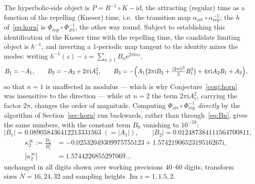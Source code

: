 \documentclass[11pt,a4paper]{article}
\theoremstyle{definition}
\newcommand{\Rr}{R}
\newcommand{\Kk}{K}
\newcommand{\eee}{\mathrm{e}}
\newcommand{\ii}{\mathrm{i}}
\begin{document}
The hyperbolic-side object is $P=\Rr^{-1}\circ\Kk-\mathrm{id}$, the attracting
(regular) time as a function of the repelling (Kneser) time, i.e.\ the
transition map $\alpha_{\mathrm{att}}\circ\alpha_{\mathrm{rep}}^{-1}$;
the $h$ of~\eqref{eq:horn} is $\Phi_{\mathrm{rep}}\circ\Phi_{\mathrm{att}}^{-1}$,
the other way round.  Subject to establishing this identification of the
Kneser time with the repelling time, the candidate limiting object is
$h^{-1}$, and inverting a $1$-periodic map tangent to the identity mixes the
modes: writing $h^{-1}(z)-z=\sum_{n\ge1}B_n\eee^{2\pi\ii nz}$,
\begin{equation}\label{eq:Bn}
  B_1=-A_1,\qquad B_2=-A_2+2\pi\ii A_1^{2},\qquad
  B_3=-\Bigl(A_1\bigl(2\pi\ii B_2+\tfrac{(2\pi\ii)^{2}}{2}B_1^{2}\bigr)
  +4\pi\ii A_2B_1+A_3\Bigr),
\end{equation}
so that $n=1$ is unaffected in modulus --- which is why
Conjecture~\ref{conj:horn} was insensitive to the direction --- while at $n=2$
the term $2\pi\ii A_1^{2}$, carrying the factor $2\pi$, changes the order of
magnitude.  Computing $\Phi_{\mathrm{att}}\circ\Phi_{\mathrm{rep}}^{-1}$
\emph{directly} by the algorithm of Section~\ref{sec:horn} run backwards, rather
than through~\eqref{eq:Bn}, gives the same numbers, with the constant term
$B_0$ vanishing to $10^{-59}$:
\begin{equation}\label{eq:B12}
  |B_1|=0.089058436412213331563\;(=|A_1|),\qquad
  |B_2|=0.012487384111564700811,
\end{equation}
\begin{equation}\label{eq:kappainf}
\begin{aligned}
 \kappa_2^\infty:=\frac{B_2}{B_1^2}
   &=-0.02532049309975755123+1.5742190652319516267\ii,\\
 |\kappa_2^\infty|&=1.5744226855297069\ldots
\end{aligned}
\end{equation}
unchanged in all digits shown over working precisions $40$--$60$ digits,
transform sizes $N=16,24,32$ and sampling heights $\operatorname{Im}z=1,1.5,2$.
\end{document}
